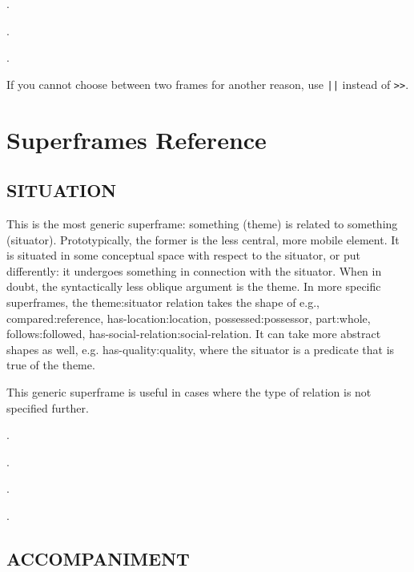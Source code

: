 \documentclass[a4paper]{article}
\newcommand{\fr}[1]{\textsf{#1}}
\newcommand{\rl}[1]{\textsf{#1}}
\begin{document}
\ex.

\ex.

\ex.

If you cannot choose between two frames for another reason, use \texttt{||} instead of \texttt{>}\texttt{>}.

\newpage\section{Superframes Reference}

\subsection{ \fr{SITUATION}}
\label{sec:SITUATION}

This is the most generic superframe: something (\rl{theme}) is related to
something (\rl{situator}). Prototypically, the former is the less central, more
mobile element. It is situated in some conceptual space with respect to the
situator, or put differently: it undergoes something in connection with the
situator. When in doubt, the syntactically less oblique argument is the
theme. In more specific superframes, the theme:situator relation takes
the shape of e.g., compared:reference, has-location:location,
possessed:possessor, part:whole, follows:followed,
has-social-relation:social-relation. It can take more abstract shapes as well,
e.g. has-quality:quality, where the situator is a predicate that is true of the
theme.

This generic superframe is useful in cases where the type of relation is not
specified further.

\ex.

\ex.

\ex.

\ex.

\newpage\subsection{ \fr{ACCOMPANIMENT}}
\label{sec:ACCOMPANIMENT}
\end{document}
